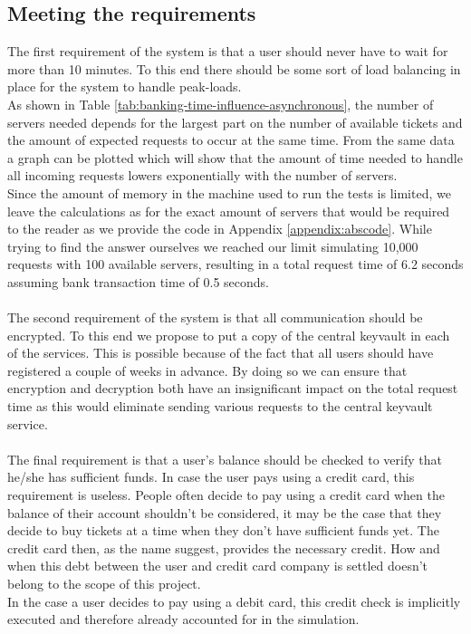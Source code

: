 \documentclass[10pt,a4paper,twocolumn]{article}
\begin{document}
\subsection{Meeting the requirements}
The first requirement of the system is that a user should never have to wait for more than 10 minutes. To this end there should be some sort of load balancing in place for the system to handle peak-loads.\\
As shown in Table \ref{tab:banking-time-influence-asynchronous}, the number of servers needed depends for the largest part on the number of available tickets and the amount of expected requests to occur at the same time. From the same data a graph can be plotted which will show that the amount of time needed to handle all incoming requests lowers exponentially with the number of servers. \\
Since the amount of memory in the machine used to run the tests is limited, we leave the calculations as for the exact amount of servers that would be required to the reader as we provide the code in Appendix \ref{appendix:abscode}. While trying to find the answer ourselves we reached our limit simulating 10,000 requests with 100 available servers, resulting in a total request time of 6.2 seconds assuming bank transaction time of 0.5 seconds.\\
\\
The second requirement of the system is that all communication should be encrypted. To this end we propose to put a copy of the central keyvault in each of the services. This is possible because of the fact that all users should have registered a couple of weeks in advance. By doing so we can ensure that encryption and decryption both have an insignificant impact on the total request time as this would eliminate sending various requests to the central keyvault service.\\
\\
The final requirement is that a user's balance should be checked to verify that he/she has sufficient funds. In case the user pays using a credit card, this requirement is useless. People often decide to pay using a credit card when the balance of their account shouldn't be considered, it may be the case that they decide to buy tickets at a time when they don't have sufficient funds yet. The credit card then, as the name suggest, provides the necessary credit. How and when this debt between the user and credit card company is settled doesn't belong to the scope of this project.\\
In the case a user decides to pay using a debit card, this credit check is implicitly executed and therefore already accounted for in the simulation. 
\end{document}
